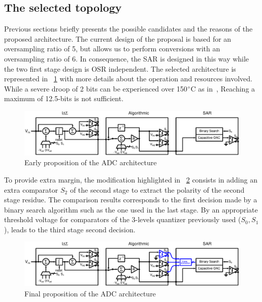 \subsection{The selected topology}
\label{sec:selected-topology}
Previous sections briefly presents the possible candidates and the reasons of the proposed architecture. The current design of the proposal is based for an oversampling ratio of 5, but allows us to perform conversions with an oversampling ratio of 6. In consequence, the SAR is designed in this way while the two first stage design is OSR independent. The selected architecture is represented in \figurename~\ref{fig:early-prop-adc-architecture} with more details about the operation and resources involved. While a severe droop of 2 bits can be experienced over 150\(\degree \)C as in~\cite{Ericson2004}, Reaching a maximum of 12.5-bits is not sufficient.

\begin{figure}[htp]
	\centering
	\includegraphics[width=\textwidth]{Chapter4/Figs/architecture-full-principle.ps}
	\caption{Early proposition of the ADC architecture}
	\label{fig:early-prop-adc-architecture}
\end{figure}

To provide extra margin, the modification highlighted in \figurename~\ref{fig:final-prop-adc-architecture} consists in adding an extra comparator \(S_2\) of the second stage to extract the polarity of the second stage residue. The comparison results corresponds to the first decision made by a binary search algorithm such as the one used in the last stage. By an appropriate threshold voltage for comparators of the 3-levels quantizer previously used (\(S_0, S_1 \)), leads to the third stage second decision.

\begin{figure}[htp]
	\centering
	\includegraphics[width=\textwidth]{Chapter4/Figs/architecture-full-principle-final.ps}
	\caption{Final proposition of the ADC architecture}
	\label{fig:final-prop-adc-architecture}
\end{figure}

